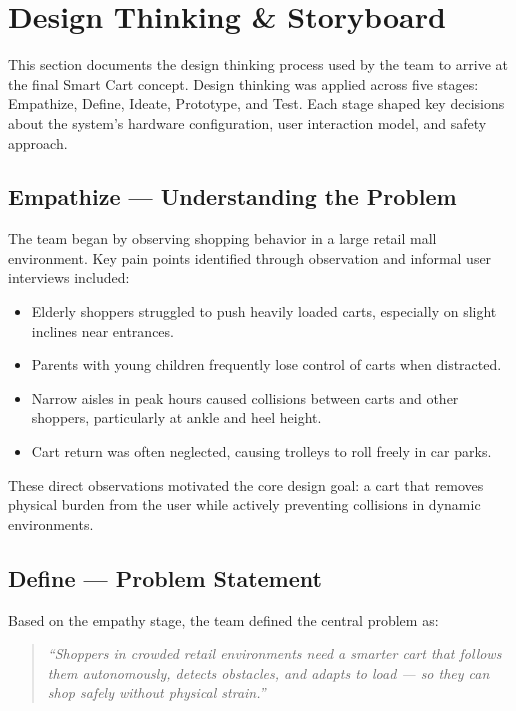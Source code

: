 \section{Design Thinking \& Storyboard}

This section documents the design thinking process used by the team to
arrive at the final Smart Cart concept. Design thinking was applied across
five stages: Empathize, Define, Ideate, Prototype, and Test. Each stage
shaped key decisions about the system's hardware configuration, user
interaction model, and safety approach.

\subsection{Empathize --- Understanding the Problem}

The team began by observing shopping behavior in a large retail mall
environment. Key pain points identified through observation and informal
user interviews included:
\begin{itemize}
  \item Elderly shoppers struggled to push heavily loaded carts, especially on slight inclines near entrances.
  \item Parents with young children frequently lose control of carts when distracted.
  \item Narrow aisles in peak hours caused collisions between carts and other shoppers, particularly at ankle and heel height.
  \item Cart return was often neglected, causing trolleys to roll freely in car parks.
\end{itemize}

These direct observations motivated the core design goal: a cart that
removes physical burden from the user while actively preventing collisions
in dynamic environments.

\subsection{Define --- Problem Statement}

Based on the empathy stage, the team defined the central problem as:

\begin{quote}
\textit{``Shoppers in crowded retail environments need a smarter cart
that follows them autonomously, detects obstacles, and adapts to load ---
so they can shop safely without physical strain.''}
\end{quote}

